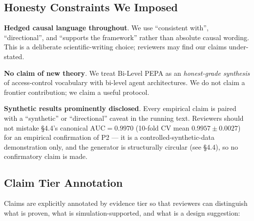 \subsection{Honesty Constraints We Imposed}

\textbf{Hedged causal language throughout}. We use ``consistent with'', ``directional'', and ``supports the framework'' rather than absolute causal wording. This is a deliberate scientific-writing choice; reviewers may find our claims under-stated.

\textbf{No claim of new theory}. We treat Bi-Level PEPA as an \emph{honest-grade synthesis} of access-control vocabulary with bi-level agent architectures. We do not claim a frontier contribution; we claim a useful protocol.

\textbf{Synthetic results prominently disclosed}. Every empirical claim is paired with a ``synthetic'' or ``directional'' caveat in the running text. Reviewers should not mistake \S4.4's canonical $\text{AUC}=0.9970$ (10-fold CV mean $0.9957\pm0.0027$) for an empirical confirmation of P2 --- it is a controlled-synthetic-data demonstration only, and the generator is structurally circular (see \S4.4), so no confirmatory claim is made.


\subsection{Claim Tier Annotation}

Claims are explicitly annotated by evidence tier so that reviewers can distinguish what is proven, what is simulation-supported, and what is a design suggestion:

